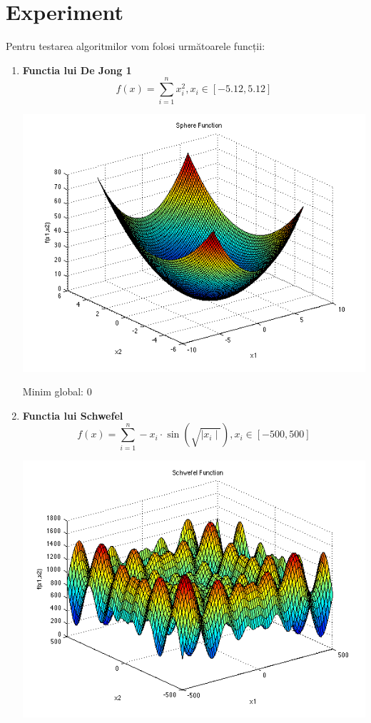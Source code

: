 \documentclass{article}
\begin{document}
\section{Experiment}
Pentru testarea algoritmilor vom folosi următoarele funcții:
\begin{enumerate}
\item \textbf{Functia lui De Jong 1}
$$ f(x) = \sum_{i=1}^n x_i^2, 
x_i \in \left[ -5.12, 5.12 \right]$$

\includegraphics[scale=0.5]{spheref.png}

Minim global: 0

\item \textbf{Functia lui Schwefel}
$$ f(x) = \sum_{i=1}^n -x_i \cdot \sin (\sqrt{\mid x_i\mid}),
x_i \in \left[ -500, 500\right]  $$

\includegraphics[scale=0.5]{schwef.png}


\end{enumerate}
\end{document}
